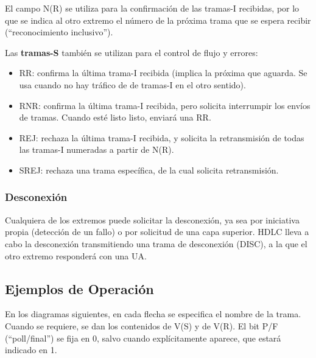 \documentclass[withindex,glossary]{cam-thesis}
\begin{document}
El campo N(R) se utiliza para la confirmación de las tramas-I recibidas, por lo que se indica al otro extremo el número de la próxima trama que se espera recibir (“reconocimiento inclusivo”). 

Las \textbf{tramas-S} también se utilizan para el control de flujo y errores:
\begin{itemize}
	\item RR: confirma la última trama-I recibida (implica la próxima que aguarda. Se usa cuando no hay tráfico de de tramas-I en el otro sentido).
    \item RNR: confirma la última trama-I recibida, pero solicita interrumpir los envíos de tramas. Cuando esté listo listo, enviará una RR.
    \item REJ: rechaza la última trama-I recibida, y solicita la retransmisión de todas las tramas-I numeradas a partir de N(R).
    \item SREJ: rechaza una trama específica, de la cual solicita retransmisión.
\end{itemize}

\subsubsection{Desconexión}
Cualquiera de los extremos puede solicitar la desconexión, ya sea por iniciativa propia (detección de un fallo) o por solicitud de una capa superior. HDLC lleva a cabo la desconexión transmitiendo una trama de desconexión (DISC), a la que el otro extremo responderá con una UA.

\subsection{Ejemplos de Operación}
En los diagramas siguientes, en cada flecha se especifica el nombre de la trama. Cuando se requiere, se dan los contenidos de V(S) y de V(R). El bit P/F (“poll/final”) se fija en 0, salvo cuando explícitamente aparece, que estará indicado en 1.
\end{document}
